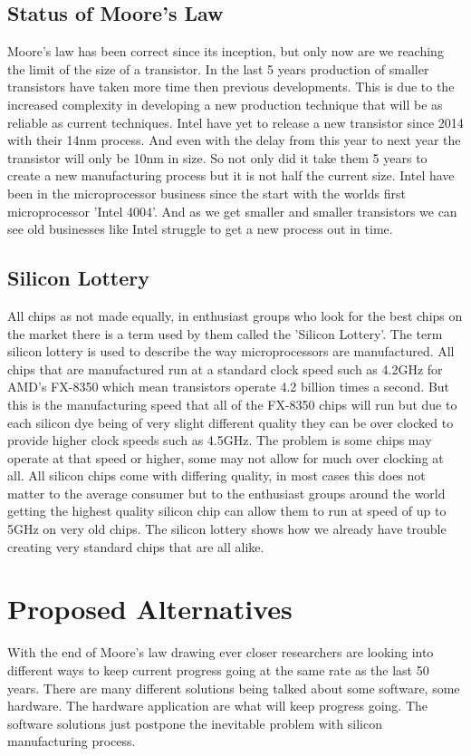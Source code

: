 \documentclass[journal]{IEEEtran}
\begin{document}
\subsection{Status of Moore's Law}
Moore's law has been correct since its inception, but only now are we reaching the limit of the size of a transistor. \cite{591665} In the last 5 years production of smaller transistors have taken more time then previous developments. This is due to the increased complexity in developing a new production technique that will be as reliable as current techniques. Intel have yet to release a new transistor since 2014 with their 14nm process. And even with the delay from this year to next year the transistor will only be 10nm in size. So not only did it take them 5 years to create a new manufacturing process but it is not half the current size. Intel have been in the microprocessor business since the start with the worlds first microprocessor 'Intel 4004'. And as we get smaller and smaller transistors we can see old businesses like Intel struggle to get a new process out in time.

\subsection{Silicon Lottery}
All chips as not made equally, in enthusiast groups who look for the best chips on the market there is a term used by them called the 'Silicon Lottery'. The term silicon lottery is used to describe the way microprocessors are manufactured. All chips that are manufactured run at a standard clock speed such as 4.2GHz for AMD's FX-8350 which mean transistors operate 4.2 billion times a second. But this is the manufacturing speed that all of the FX-8350 chips will run but due to each silicon dye being of very slight different quality they can be over clocked to provide higher clock speeds such as 4.5GHz. The problem is some chips may operate at that speed or higher, some may not allow for much over clocking at all. All silicon chips come with differing quality, in most cases this does not matter to the average consumer but to the enthusiast groups around the world getting the highest quality silicon chip can allow them to run at speed of up to 5GHz on very old chips. The silicon lottery shows how we already have trouble creating very standard chips that are all alike.

\section{Proposed Alternatives}
With the end of Moore's law drawing ever closer researchers are looking into different ways to keep current progress going at the same rate as the last 50 years. There are many different solutions being talked about some software, some hardware. The hardware application are what will keep progress going. The software solutions just postpone the inevitable problem with silicon manufacturing process.
\end{document}
